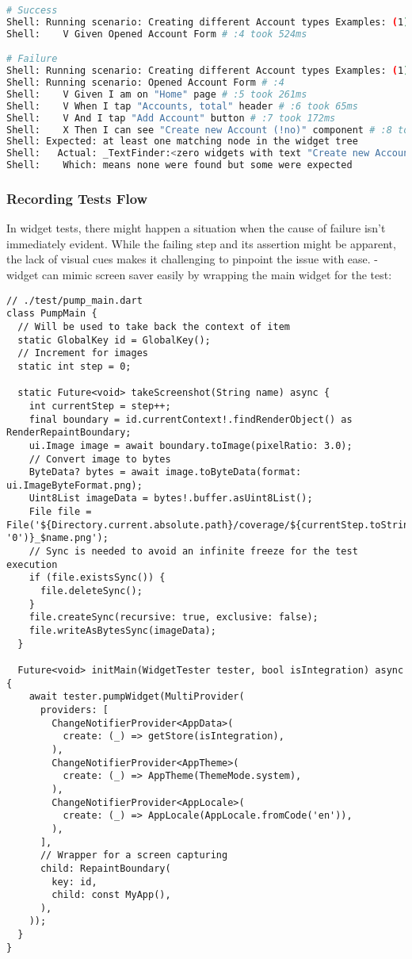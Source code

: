 \begin{lstlisting}[language=bash]
# Success
Shell: Running scenario: Creating different Account types Examples: (1) # :3
Shell:    V Given Opened Account Form # :4 took 524ms

# Failure
Shell: Running scenario: Creating different Account types Examples: (1) # :3
Shell: Running scenario: Opened Account Form # :4
Shell:    V Given I am on "Home" page # :5 took 261ms
Shell:    V When I tap "Accounts, total" header # :6 took 65ms
Shell:    V And I tap "Add Account" button # :7 took 172ms
Shell:    X Then I can see "Create new Account (!no)" component # :8 took 4ms  
Shell: Expected: at least one matching node in the widget tree
Shell:   Actual: _TextFinder:<zero widgets with text "Create new Account (!no)" (ignoring offstage widgets)>
Shell:    Which: means none were found but some were expected
\end{lstlisting}


\subsubsection{Recording Tests Flow} \label{t-record}

In widget tests, there might happen a situation when the cause of failure isn't immediately evident. While the failing 
step and its assertion might be apparent, the lack of visual cues makes it challenging to pinpoint the issue with ease.
-widget can mimic screen saver easily by wrapping the main widget for the test:

\begin{lstlisting}
// ./test/pump_main.dart
class PumpMain {
  // Will be used to take back the context of item
  static GlobalKey id = GlobalKey();
  // Increment for images
  static int step = 0;

  static Future<void> takeScreenshot(String name) async {
    int currentStep = step++;
    final boundary = id.currentContext!.findRenderObject() as RenderRepaintBoundary;
    ui.Image image = await boundary.toImage(pixelRatio: 3.0);
    // Convert image to bytes
    ByteData? bytes = await image.toByteData(format: ui.ImageByteFormat.png);
    Uint8List imageData = bytes!.buffer.asUint8List();
    File file = File('${Directory.current.absolute.path}/coverage/${currentStep.toString().padLeft(8, '0')}_$name.png');
    // Sync is needed to avoid an infinite freeze for the test execution
    if (file.existsSync()) {
      file.deleteSync();
    }
    file.createSync(recursive: true, exclusive: false);
    file.writeAsBytesSync(imageData);
  }

  Future<void> initMain(WidgetTester tester, bool isIntegration) async {
    await tester.pumpWidget(MultiProvider(
      providers: [
        ChangeNotifierProvider<AppData>(
          create: (_) => getStore(isIntegration),
        ),
        ChangeNotifierProvider<AppTheme>(
          create: (_) => AppTheme(ThemeMode.system),
        ),
        ChangeNotifierProvider<AppLocale>(
          create: (_) => AppLocale(AppLocale.fromCode('en')),
        ),
      ],
      // Wrapper for a screen capturing
      child: RepaintBoundary(
        key: id,
        child: const MyApp(),
      ),
    ));
  }
}
\end{lstlisting}

